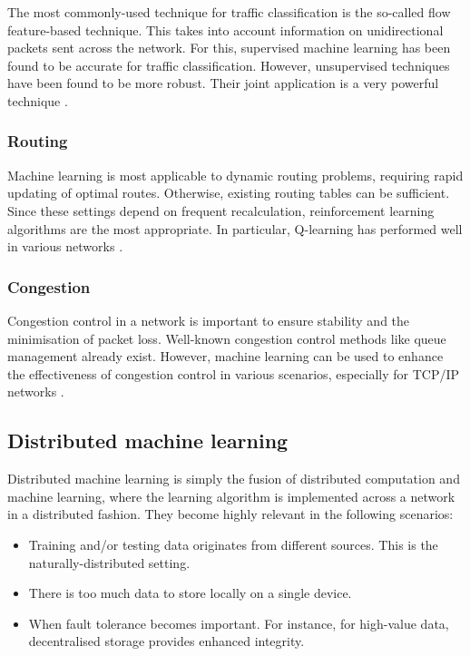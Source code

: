 \documentclass[twocolumn, aps, rmp, amsmath, amssymb, nofootinbib, superscriptaddress, longbibliography, floatfix, table-of-contents, eqsecnum]{revtex4}
\begin{document}
The most commonly-used technique for traffic classification is the so-called flow feature-based technique. This takes into account information on unidirectional packets sent across the network. For this, supervised machine learning has been found to be accurate for traffic classification. However, unsupervised techniques have been found to be more robust. Their joint application is a very powerful technique \cite{bib:erman2007offline, bib:zhang2015robust}.

\subsubsection{Routing}

Machine learning is most applicable to dynamic routing problems, requiring rapid updating of optimal routes. Otherwise, existing routing tables can be sufficient. Since these settings depend on frequent recalculation, reinforcement learning algorithms are the most appropriate. In particular, Q-learning has performed well in various networks \cite{bib:wang2006adaptive, bib:forster2007froms, arroyo2007q}.

\subsubsection{Congestion}

Congestion control in a network is important to ensure stability and the minimisation of packet loss. Well-known congestion control methods like queue management already exist. However, machine learning can be used to enhance the effectiveness of congestion control in various scenarios, especially for TCP/IP networks \cite{bib:liu2002end, bib:barman2004model, bib:el2005improving}. 

\subsection{Distributed machine learning}

Distributed machine learning is simply the fusion of distributed computation and machine learning, where the learning algorithm is implemented across a network in a distributed fashion. They become highly relevant in the following scenarios:
\begin{itemize}
\item Training and/or testing data originates from different sources. This is the naturally-distributed setting.%
\item There is too much data to store locally on a single device.
\item When fault tolerance becomes important. For instance, for high-value data, decentralised storage provides enhanced integrity.
\end{itemize}
\end{document}
